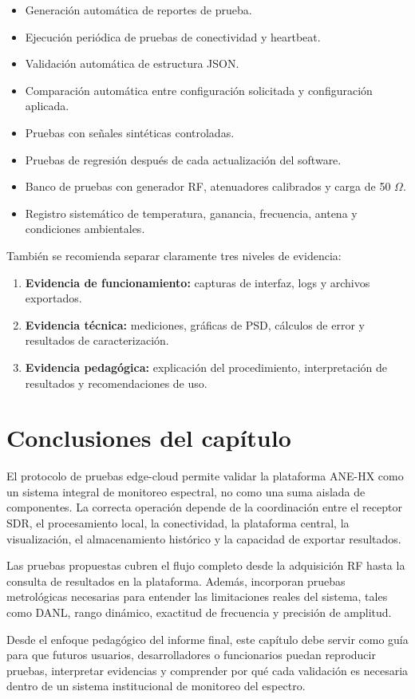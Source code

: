 \begin{itemize}
    \item Generación automática de reportes de prueba.
    \item Ejecución periódica de pruebas de conectividad y heartbeat.
    \item Validación automática de estructura JSON.
    \item Comparación automática entre configuración solicitada y configuración aplicada.
    \item Pruebas con señales sintéticas controladas.
    \item Pruebas de regresión después de cada actualización del software.
    \item Banco de pruebas con generador RF, atenuadores calibrados y carga de 50 $\Omega$.
    \item Registro sistemático de temperatura, ganancia, frecuencia, antena y condiciones ambientales.
\end{itemize}

También se recomienda separar claramente tres niveles de evidencia:

\begin{enumerate}
    \item \textbf{Evidencia de funcionamiento:} capturas de interfaz, logs y archivos exportados.
    \item \textbf{Evidencia técnica:} mediciones, gráficas de PSD, cálculos de error y resultados de caracterización.
    \item \textbf{Evidencia pedagógica:} explicación del procedimiento, interpretación de resultados y recomendaciones de uso.
\end{enumerate}

\section{Conclusiones del capítulo}

El protocolo de pruebas edge-cloud permite validar la plataforma ANE-HX como un sistema integral de monitoreo espectral, no como una suma aislada de componentes. La correcta operación depende de la coordinación entre el receptor SDR, el procesamiento local, la conectividad, la plataforma central, la visualización, el almacenamiento histórico y la capacidad de exportar resultados.

Las pruebas propuestas cubren el flujo completo desde la adquisición RF hasta la consulta de resultados en la plataforma. Además, incorporan pruebas metrológicas necesarias para entender las limitaciones reales del sistema, tales como DANL, rango dinámico, exactitud de frecuencia y precisión de amplitud.

Desde el enfoque pedagógico del informe final, este capítulo debe servir como guía para que futuros usuarios, desarrolladores o funcionarios puedan reproducir pruebas, interpretar evidencias y comprender por qué cada validación es necesaria dentro de un sistema institucional de monitoreo del espectro.
